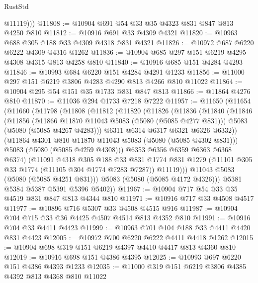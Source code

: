 \begin{lexlean}{RustStd}
\begin{coremodule}
{\begin{coremodule}
{{{{{          @11119)))
@11808 := @10904 @691 @54 @33 @35 @4323 @831 @847 @813 @4250 @810
@11812 := @10916 @691 @33 @4309 @4321
@11820 := @10963 @688 @305 @188 @33 @4309 @4318 @831 @4321
@11826 := @10972 @687 @6220 @6222 @4309 @4316 @1262
@11836 := @10904 @685 @297 @151 @6219 @4295 @4308 @4315 @813 @4258 @810
@11840 := @10916 @685 @151 @4284 @4293
@11846 := @10993 @684 @6220 @151 @4284 @4291 @1233
@11856 := @11000 @297 @151 @6219 @3806 @4283 @4290 @813 @4266 @810 @11022
@11864 := @10904 @295 @54 @151 @35 @1733 @831 @847 @813
@11866 := @11864 @4276 @810
@11870 := @11036 @294 @1733 @7218 @7222
@11957 := @11650
    (@11654
      (@11660
        (@11798
          (@11808
            (@11812
              (@11820
                (@11826
                  (@11836
                    (@11840
                      (@11846
                        (@11856
                          (@11866 @11870 @11043 @5083 (@5080 (@5085 @4277 @831)))
                          @5083
                          (@5080 (@5085 @4267 @4283)))
                        @6311
                        @6314
                        @6317
                        @6321
                        @6326
                        @6332))
                    (@11864 @4301 @810 @11870 @11043 @5083 (@5080 (@5085 @4302 @831)))
                    @5083
                    (@5080 (@5085 @4259 @4308)))
                  @6353
                  @6356
                  @6359
                  @6363
                  @6368
                  @6374)
                (@11091
                  @4318
                  @305
                  @188
                  @33
                  @831
                  @1774
                  @831
                  @1279
                  (@11101 @305 @33 @1774 (@11105 @304 @1774 @7283 @7287))
                  @11119)))
            @11043
            @5083
            (@5080 (@5085 @4251 @831)))
          @5083
          (@5080 (@5085 @4172 @4326)))
        @5381
        @5384
        @5387
        @5391
        @5396
        @5402))
@11967 := @10904 @717 @54 @33 @35 @4519 @831 @847 @813 @4344 @810
@11971 := @10916 @717 @33 @4508 @4517
@11977 := @10896 @716 @5307 @33 @4508 @4515 @916
@11987 := @10904 @704 @715 @33 @36 @4425 @4507 @4514 @813 @4352 @810
@11991 := @10916 @704 @33 @4411 @4423
@11999 := @10963 @701 @104 @188 @33 @4411 @4420 @831 @4423
@12005 := @10972 @700 @6220 @6222 @4411 @4418 @1262
@12015 := @10904 @698 @319 @151 @6219 @4397 @4410 @4417 @813 @4360 @810
@12019 := @10916 @698 @151 @4386 @4395
@12025 := @10993 @697 @6220 @151 @4386 @4393 @1233
@12035 := @11000 @319 @151 @6219 @3806 @4385 @4392 @813 @4368 @810 @11022
}}}}}
\end{coremodule}}
\end{coremodule}
\end{lexlean}
